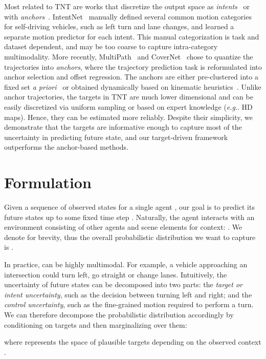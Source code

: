 \documentclass{article}
\makeatletter
\DeclareRobustCommand\onedot{\futurelet\@let@token\@onedot}
\def\@onedot{\ifx\@let@token.\else.\null\fi\xspace}
\newcommand{\model}{TNT\xspace}
\def\eg{\emph{e.g}\onedot} \def\Eg{\emph{E.g}\onedot}
\makeatother
\begin{document}
Most related to \model are works that discretize the output space as \textit{intents}~\cite{casas2018intentnet} or with \textit{anchors}~\cite{chai2019multipath,phan2019covernet}. IntentNet~\cite{casas2018intentnet} manually defined several common motion categories for self-driving vehicles, such as left turn and lane changes, and learned a separate motion predictor for each intent. This manual categorization is task and dataset dependent, and may be too coarse to capture intra-category multimodality. More recently, MultiPath~\cite{chai2019multipath} and CoverNet~\cite{phan2019covernet} chose to quantize the trajectories into \textit{anchors}, where the trajectory prediction task is reformulated into anchor selection and offset regression. The anchors are either pre-clustered into a fixed set \textit{a priori}~\cite{chai2019multipath} or obtained dynamically based on kinematic heuristics~\cite{phan2019covernet}. Unlike anchor trajectories, the targets in \model are much lower dimensional and can be easily discretized via uniform sampling or based on expert knowledge (\eg HD maps). Hence, they can be estimated more reliably.
Despite their simplicity, we demonstrate that the targets are informative enough to capture most of the uncertainty in predicting future state, and our target-driven framework outperforms the anchor-based methods. \section{Formulation}
Given a sequence of observed states for a single agent , our goal is to predict its future states  up to some fixed time step . Naturally, the agent interacts with an environment consisting of other agents and scene elements for context: . We denote  for brevity, thus the overall probabilistic distribution we want to capture is .

In practice,  can be highly multimodal.
For example, a vehicle approaching an intersection could turn left, go straight or change lanes.
Intuitively, the uncertainty of future states can be decomposed into two parts: the \textit{target or intent uncertainty}, such as the decision between turning left and right; and the \textit{control uncertainty}, such as the fine-grained motion required to perform a turn.
We can therefore decompose the probabilistic distribution accordingly by conditioning on targets and then marginalizing over them:

where  represents the space of plausible targets depending on the observed context .
\end{document}
